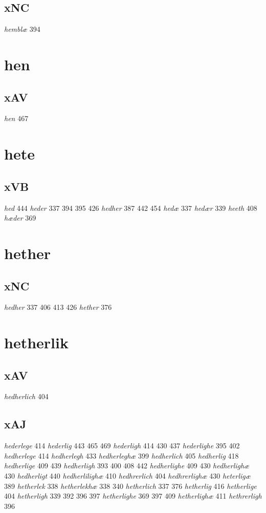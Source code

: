 \documentclass[a4paper,twocolumn]{article}
\begin{document}
\subsection{xNC}
\label{sec:org0d9b5d4}
\emph{hemblæ} 394 
\section{hen}
\label{sec:org3969958}
\subsection{xAV}
\label{sec:orge27a5e4}
\emph{hen} 467 
\section{hete}
\label{sec:orgfc3152d}
\subsection{xVB}
\label{sec:org17253ad}
\emph{hed} 444 \emph{heder} 337 394 395 426 \emph{hedher} 387 442 454 \emph{hedæ} 337 \emph{hedær} 339 \emph{heeth} 408 \emph{hæder} 369 
\section{hether}
\label{sec:org97199c6}
\subsection{xNC}
\label{sec:orge403a8d}
\emph{hedher} 337 406 413 426 \emph{hether} 376 
\section{hetherlik}
\label{sec:orge9b1050}
\subsection{xAV}
\label{sec:org6335b5a}
\emph{hedherlich} 404 
\subsection{xAJ}
\label{sec:orgd465d10}
\emph{hederlege} 414 \emph{hederlig} 443 465 469 \emph{hederligh} 414 430 437 \emph{hederlighe} 395 402 \emph{hedherlege} 414 \emph{hedherlegh} 433 \emph{hedherleghæ} 399 \emph{hedherlich} 405 \emph{hedherlig} 418 \emph{hedherlige} 409 439 \emph{hedherligh} 393 400 408 442 \emph{hedherlighe} 409 430 \emph{hedherlighæ} 430 \emph{hedherligt} 440 \emph{hedherlilighæ} 410 \emph{hedhrerlich} 404 \emph{hedhrerlighæ} 430 \emph{heterligæ} 389 \emph{hetherlek} 338 \emph{hetherlekhæ} 338 340 \emph{hetherlich} 337 376 \emph{hetherlig} 416 \emph{hetherlige} 404 \emph{hetherligh} 339 392 396 397 \emph{hetherlighe} 369 397 409 \emph{hetherlighæ} 411 \emph{hethrerligh} 396 
\end{document}
